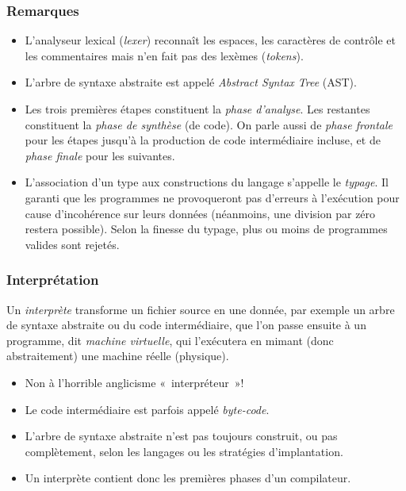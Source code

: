 %
\begin{frame}
\frametitle{Remarques}

\begin{itemize}

  \item L'analyseur lexical (\emph{lexer}) reconnaît les
  espaces, les caractères de contrôle et les commentaires mais n'en
  fait pas des lexèmes (\emph{tokens}).

  \item L'arbre de syntaxe abstraite est appelé
  \emph{Abstract Syntax Tree} (AST).

  \item Les trois premières étapes constituent la
  \emph{phase d'analyse}. Les restantes constituent la \emph{phase de
  synthèse} (de code). On parle aussi de \emph{phase frontale} pour
  les étapes jusqu'à la production de code intermédiaire incluse, et
  de \emph{phase finale} pour les suivantes.

  \item L'association d'un type aux constructions du
  langage s'appelle le \emph{typage}. Il garanti que les programmes ne
  provoqueront pas d'erreurs à l'exécution pour cause d'incohérence
  sur leurs données (néanmoins, une division par zéro restera
  possible). Selon la finesse du typage, plus ou moins de programmes
  valides sont rejetés.

\end{itemize}

\end{frame}

%
\begin{frame}
\frametitle{Interprétation}

Un \emph{interprète} transforme un fichier source en une donnée,
par exemple un arbre de syntaxe abstraite ou du code intermédiaire,
que l'on passe ensuite à un programme, dit \emph{machine virtuelle},
qui l'exécutera en mimant (donc abstraitement) une machine réelle
(physique).

\bigskip

\remarques

\begin{itemize}

  \item Non à l'horrible anglicisme «~interpréteur~»!

  \item Le code intermédiaire est parfois appelé \emph{byte-code}.

  \item L'arbre de syntaxe abstraite n'est pas toujours
  construit, ou pas complètement, selon les langages ou les stratégies
  d'implantation.

  \item Un interprète contient donc les premières phases
  d'un compilateur.

\end{itemize}

\end{frame}

